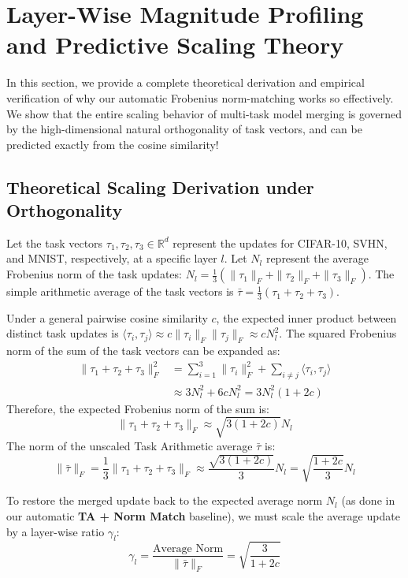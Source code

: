 \documentclass{article}
\begin{document}
\section{Layer-Wise Magnitude Profiling and Predictive Scaling Theory}
\label{app:magnitude_profiling}

In this section, we provide a complete theoretical derivation and empirical verification of why our automatic Frobenius norm-matching works so effectively. We show that the entire scaling behavior of multi-task model merging is governed by the high-dimensional natural orthogonality of task vectors, and can be predicted exactly from the cosine similarity!

\subsection{Theoretical Scaling Derivation under Orthogonality}

Let the task vectors $\tau_1, \tau_2, \tau_3 \in \mathbb{R}^d$ represent the updates for CIFAR-10, SVHN, and MNIST, respectively, at a specific layer $l$. Let $N_l$ represent the average Frobenius norm of the task updates: $N_l = \frac{1}{3}(\|\tau_1\|_F + \|\tau_2\|_F + \|\tau_3\|_F)$. The simple arithmetic average of the task vectors is $\bar{\tau} = \frac{1}{3}(\tau_1 + \tau_2 + \tau_3)$.

Under a general pairwise cosine similarity $c$, the expected inner product between distinct task updates is $\langle \tau_i, \tau_j \rangle \approx c \|\tau_i\|_F \|\tau_j\|_F \approx c N_l^2$. The squared Frobenius norm of the sum of the task vectors can be expanded as:
\begin{align}
    \|\tau_1 + \tau_2 + \tau_3\|_F^2 &= \sum_{i=1}^3 \|\tau_i\|_F^2 + \sum_{i \neq j} \langle \tau_i, \tau_j \rangle \\
    &\approx 3 N_l^2 + 6 c N_l^2 = 3 N_l^2 (1 + 2 c)
\end{align}
Therefore, the expected Frobenius norm of the sum is:
\begin{equation}
    \|\tau_1 + \tau_2 + \tau_3\|_F \approx \sqrt{3(1 + 2c)} N_l
\end{equation}
The norm of the unscaled Task Arithmetic average $\bar{\tau}$ is:
\begin{equation}
    \|\bar{\tau}\|_F = \frac{1}{3} \|\tau_1 + \tau_2 + \tau_3\|_F \approx \frac{\sqrt{3(1 + 2c)}}{3} N_l = \sqrt{\frac{1 + 2c}{3}} N_l
\end{equation}

To restore the merged update back to the expected average norm $N_l$ (as done in our automatic \textbf{TA + Norm Match} baseline), we must scale the average update by a layer-wise ratio $\gamma_l$:
\begin{equation}
    \gamma_l = \frac{\text{Average Norm}}{\|\bar{\tau}\|_F} = \sqrt{\frac{3}{1 + 2c}}
\end{equation}
\end{document}
